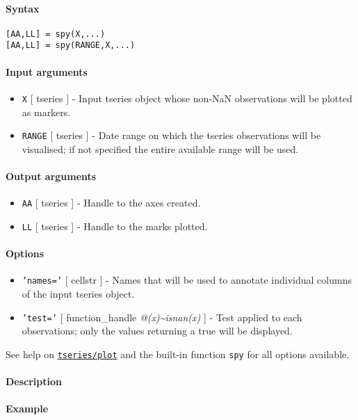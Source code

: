 


	\paragraph{Syntax}\label{syntax}

\begin{verbatim}
[AA,LL] = spy(X,...)
[AA,LL] = spy(RANGE,X,...)
\end{verbatim}

\paragraph{Input arguments}\label{input-arguments}

\begin{itemize}
\item
  \texttt{X} {[} tseries {]} - Input tseries object whose non-NaN
  observations will be plotted as markers.
\item
  \texttt{RANGE} {[} tseries {]} - Date range on which the tseries
  observations will be visualised; if not specified the entire available
  range will be used.
\end{itemize}

\paragraph{Output arguments}\label{output-arguments}

\begin{itemize}
\item
  \texttt{AA} {[} tseries {]} - Handle to the axes created.
\item
  \texttt{LL} {[} tseries {]} - Handle to the marks plotted.
\end{itemize}

\paragraph{Options}\label{options}

\begin{itemize}
\item
  \texttt{'names='} {[} cellstr {]} - Names that will be used to
  annotate individual columns of the input tseries object.
\item
  \texttt{'test='} {[} function\_handle \textbar{}
  \emph{@(x)\textasciitilde{}isnan(x)} {]} - Test applied to each
  observations; only the values returning a true will be displayed.
\end{itemize}

See help on \href{tseries/plot}{\texttt{tseries/plot}} and the built-in
function \texttt{spy} for all options available.

\paragraph{Description}\label{description}

\paragraph{Example}\label{example}


